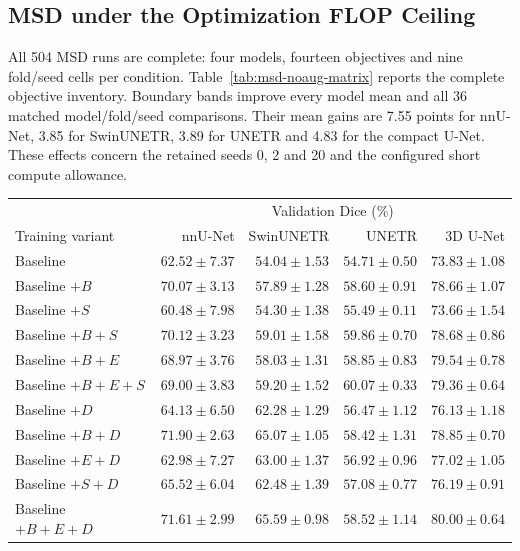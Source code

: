 \documentclass[12pt,a4paper]{article}
\begin{document}
\FloatBarrier

\FloatBarrier
\subsection{MSD under the Optimization FLOP Ceiling}
\label{sec:main-msd-results}

All 504 MSD runs are complete: four models, fourteen objectives and
nine fold/seed cells per condition. Table~\ref{tab:msd-noaug-matrix}
reports the complete objective inventory. Boundary bands improve every
model mean and all 36 matched model/fold/seed comparisons. Their mean
gains are 7.55 points for nnU-Net, 3.85 for SwinUNETR, 3.89 for UNETR
and 4.83 for the compact U-Net. These effects concern the retained
seeds 0, 2 and 20 and the configured short compute allowance.
\begin{table}[htbp]
\centering\small{}
\setlength{\tabcolsep}{5pt}
\renewcommand{\arraystretch}{1.15}
\begin{tabular}{@{}lrrrr@{}}
\hline
 & \multicolumn{4}{c}{Validation Dice (\%)} \\
Training variant & nnU-Net & SwinUNETR & UNETR & 3D U-Net \\
\hline
Baseline & $62.52\pm7.37$ & $54.04\pm1.53$ & $54.71\pm0.50$ & $73.83\pm1.08$ \\
Baseline $+B$ & $70.07\pm3.13$ & $57.89\pm1.28$ & $58.60\pm0.91$ & $78.66\pm1.07$ \\
Baseline $+S$ & $60.48\pm7.98$ & $54.30\pm1.38$ & $55.49\pm0.11$ & $73.66\pm1.54$ \\
Baseline $+B+S$ & $70.12\pm3.23$ & $59.01\pm1.58$ & $59.86\pm0.70$ & $78.68\pm0.86$ \\
Baseline $+B+E$ & $68.97\pm3.76$ & $58.03\pm1.31$ & $58.85\pm0.83$ & $79.54\pm0.78$ \\
Baseline $+B+E+S$ & $69.00\pm3.83$ & $59.20\pm1.52$ & $\mathbf{60.07\pm0.33}$ & $79.36\pm0.64$ \\
Baseline $+D$ & $64.13\pm6.50$ & $62.28\pm1.29$ & $56.47\pm1.12$ & $76.13\pm1.18$ \\
Baseline $+B+D$ & $71.90\pm2.63$ & $65.07\pm1.05$ & $58.42\pm1.31$ & $78.85\pm0.70$ \\
Baseline $+E+D$ & $62.98\pm7.27$ & $63.00\pm1.37$ & $56.92\pm0.96$ & $77.02\pm1.05$ \\
Baseline $+S+D$ & $65.52\pm6.04$ & $62.48\pm1.39$ & $57.08\pm0.77$ & $76.19\pm0.91$ \\
Baseline $+B+E+D$ & $71.61\pm2.99$ & $65.59\pm0.98$ & $58.52\pm1.14$ & $\mathbf{80.00\pm0.64}$ \\

\end{tabular}
\end{table}
\end{document}
